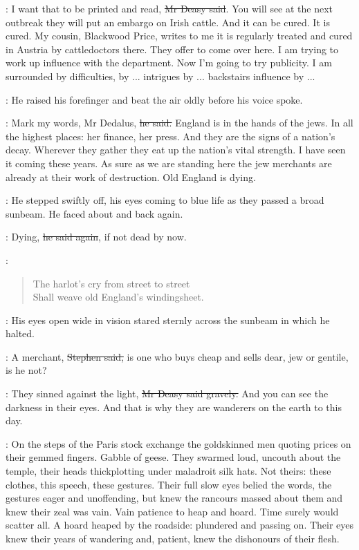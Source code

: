 \deasy:
I want that to be printed and read, \sout{Mr Deasy said}.
You will see at the next outbreak they will put an embargo on Irish cattle.
And it can be cured.
It is cured.
My cousin, Blackwood Price, writes to me
it is regularly treated and cured in Austria by cattledoctors there.
They offer to come over here.
I am trying to work up influence with the department.
Now I'm going to try publicity.
I am surrounded by difficulties,
by ... intrigues by ... backstairs influence by ...

:
He raised his forefinger and beat the air oldly before his voice spoke.

\deasy:
Mark my words, Mr Dedalus, \sout{he said.}
England is in the hands of the jews.
In all the highest places: her finance, her press.
And they are the signs of a nation's decay.
Wherever they gather they eat up the nation's vital strength.
I have seen it coming these years.
As sure as we are standing here
the jew merchants are already at their work of destruction.
Old England is dying.

:
He stepped swiftly off, his eyes coming to blue life
as they passed a broad sunbeam.
He faced about and back again.

\deasy:
Dying, \sout{he said again},
if not dead by now.

\StephenInt:
\begin{verse}
    The harlot's cry from street to street \\
    Shall weave old England's windingsheet.
\end{verse}

:
His eyes open wide in vision stared sternly across the sunbeam
in which he halted.

\Stephen:
A merchant, \sout{Stephen said,}
is one who buys cheap and sells dear,
jew or gentile,
is he not?

\deasy:
They sinned against the light,
\sout{Mr Deasy said gravely.}
And you can see the darkness in their eyes.
And that is why they are wanderers on the earth to this day.

\StephenInt:
On the steps of the Paris stock exchange
the goldskinned men quoting prices on their gemmed fingers.
Gabble of geese.
They swarmed loud, uncouth about the temple,
their heads thickplotting under maladroit silk hats.
Not theirs: these clothes, this speech, these gestures.
Their full slow eyes belied the words,
the gestures eager and unoffending,
but knew the rancours massed about them
and knew their zeal was vain.
Vain patience to heap and hoard.
Time surely would scatter all.
A hoard heaped by the roadside:
plundered and passing on.
Their eyes knew their years of wandering
and, patient, knew the dishonours of their flesh.


